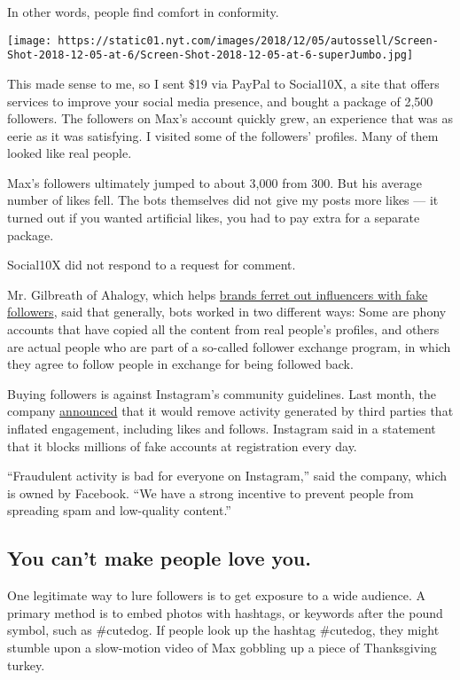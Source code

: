 In other words, people find comfort in conformity.

\texttt{[image: https://static01.nyt.com/images/2018/12/05/autossell/Screen-Shot-2018-12-05-at-6/Screen-Shot-2018-12-05-at-6-superJumbo.jpg]}

This made sense to me, so I sent \$19 via PayPal to Social10X, a site
that offers services to improve your social media presence, and bought a
package of 2,500 followers. The followers on Max's account quickly grew,
an experience that was as eerie as it was satisfying. I visited some of
the followers' profiles. Many of them looked like real people.

Max's followers ultimately jumped to about 3,000 from 300. But his
average number of likes fell. The bots themselves did not give my posts
more likes --- it turned out if you wanted artificial likes, you had to
pay extra for a separate package.

Social10X did not respond to a request for comment.

Mr. Gilbreath of Ahalogy, which helps
\href{https://www.nytimes.com/2018/03/12/business/media/instagram-bots.html}{brands
ferret out influencers with fake followers}, said that generally, bots
worked in two different ways: Some are phony accounts that have copied
all the content from real people's profiles, and others are actual
people who are part of a so-called follower exchange program, in which
they agree to follow people in exchange for being followed back.

Buying followers is against Instagram's community guidelines. Last
month, the company
\href{https://instagram-press.com/blog/2018/11/19/reducing-inauthentic-activity-on-instagram/}{announced}
that it would remove activity generated by third parties that inflated
engagement, including likes and follows. Instagram said in a statement
that it blocks millions of fake accounts at registration every day.

``Fraudulent activity is bad for everyone on Instagram,'' said the
company, which is owned by Facebook. ``We have a strong incentive to
prevent people from spreading spam and low-quality content.''

\hypertarget{you-cant-make-people-love-you}{%
\subsection{You can't make people love
you.}\label{you-cant-make-people-love-you}}

One legitimate way to lure followers is to get exposure to a wide
audience. A primary method is to embed photos with hashtags, or keywords
after the pound symbol, such as \#cutedog. If people look up the hashtag
\#cutedog, they might stumble upon a slow-motion video of Max gobbling
up a piece of Thanksgiving turkey.

